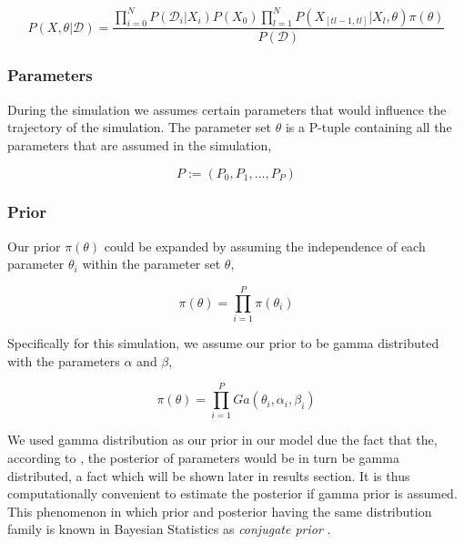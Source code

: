 \documentclass{bioinfo}
\begin{document}


\begin{equation}
P(X, \theta | \mathcal{D}) = \frac{\prod_{i=0}^{N} P(\mathcal{D}_i | X_i) P(X_0) \prod_{l=1}^{N} P(X_{[tl-1, tl]} | X_l, \theta)\pi(\theta)}{P(\mathcal{D})}\label{eq:07}
\end{equation}

\subsubsection{Parameters}

During the simulation we assumes certain parameters that would influence the trajectory of the simulation. The parameter set $\theta$ is a P-tuple containing all the parameters that are assumed in the simulation,

\begin{equation}
P := (P_0, P_1, \dots , P_P)\label{eq:08}
\end{equation}

\subsubsection{Prior}

Our prior $\pi(\theta)$ could be expanded by assuming the independence of each parameter $\theta_i$ within the parameter set $\theta$,

\begin{equation}
\pi(\theta) = \prod_{i=1}^{P} \pi(\theta_i)\label{eq:09}
\end{equation}

Specifically for this simulation, we assume our prior to be gamma distributed with the parameters $\alpha$ and $\beta$,

\begin{equation}
\pi(\theta) = \prod_{i=1}^{P} Ga(\theta_i, \alpha_i, \beta_i)\label{eq:10}
\end{equation}

We used gamma distribution as our prior in our model due the fact that the, according to \citep{Feigelman16}, the posterior of parameters would be in turn be gamma distributed, a fact which will be shown later in results section. It is thus computationally convenient to estimate the posterior if gamma prior is assumed. This phenomenon in which prior and posterior having the same distribution family is known in Bayesian Statistics as \textit{conjugate prior} \citep{Gelman14}.
\end{document}
